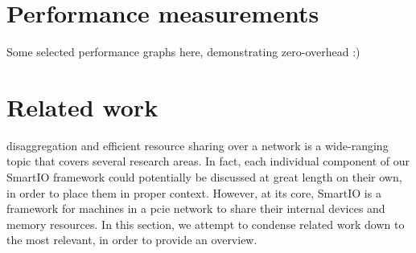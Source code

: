 \section{Performance measurements}\label{sec:eval}
Some selected performance graphs here, demonstrating zero-overhead :)



\section{Related work}\label{sec:rw}
\Gls{disaggregation} and efficient resource sharing over a network is a wide-ranging topic that covers several research areas.
%
In fact, each individual component of our SmartIO framework could potentially be discussed at great length on their own, in order to place them in proper context.
%
However, at its core, SmartIO is a framework for machines in a \gls{pcie} network to share their internal devices and memory resources.
%
In this section, we attempt to condense related work down to the most relevant, in order to provide an overview.



